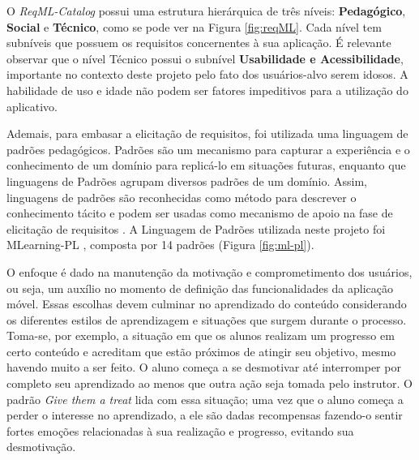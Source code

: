 O \textit{ReqML-Catalog} possui uma estrutura hierárquica de três níveis: \textbf{Pedagógico}, \textbf{Social} e \textbf{Técnico}, como se pode ver na Figura \ref{fig:reqML}. Cada nível tem subníveis que possuem os requisitos concernentes à sua aplicação. É relevante observar que o nível Técnico possui o subnível \textbf{Usabilidade e Acessibilidade}, importante no contexto deste projeto pelo fato dos usuários-alvo serem idosos. A habilidade de uso e idade não podem ser fatores impeditivos para a utilização do aplicativo.

    

Ademais, para embasar a elicitação de requisitos, foi utilizada uma linguagem de padrões pedagógicos. Padrões são um mecanismo para capturar a experiência e o conhecimento de um domínio para replicá-lo em situações futuras, enquanto que linguagens de Padrões agrupam diversos padrões de um domínio. Assim, linguagens de padrões são reconhecidas como método para descrever o conhecimento tácito e podem ser usadas como mecanismo de apoio na fase de elicitação de requisitos
\citep{Pressman2014}. A Linguagem de Padrões utilizada neste projeto foi MLearning-PL \citep{Fioravanti2017_plop}, composta por 14 padrões (Figura \ref{fig:ml-pl}). 

O enfoque é dado na manutenção da motivação e comprometimento dos usuários, ou seja, um auxílio no momento de definição das funcionalidades da aplicação móvel. Essas escolhas devem culminar no aprendizado do conteúdo considerando os diferentes estilos de aprendizagem e situações que surgem durante o processo. Toma-se, por exemplo, a situação em que os alunos realizam um progresso em certo conteúdo e acreditam que estão próximos de atingir seu objetivo, mesmo havendo muito a ser feito. O aluno começa a se desmotivar até interromper por completo seu aprendizado ao menos que outra ação seja tomada pelo instrutor. O padrão \textit{Give them a treat} lida com essa situação; uma vez que o aluno começa a perder o interesse no aprendizado, a ele são dadas recompensas fazendo-o sentir fortes emoções relacionadas à sua realização e progresso, evitando sua desmotivação.

